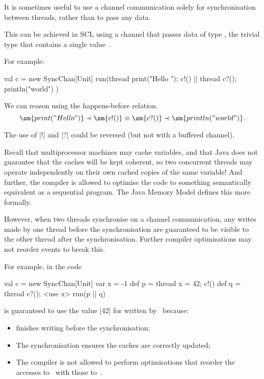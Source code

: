 
It is sometimes useful to use a channel communication solely for
synchronisation between threads, rather than to pass any data.

This can be achieved in SCL using a channel that passes data of type
, the trivial type that contains a single value~\SCALA{()}.  

For example:
\begin{scala}
val c = new SyncChan[Unit]
run(thread{ print("Hello "); c!() } || thread{ c?(); println("world") })
\end{scala}

We can reason using the happens-before relation.
\[
\sm{print("Hello")} \prec \sm{c!()} \equiv \sm{c?()} \prec \sm{println("world")}.
\]

The use of |!| and |?| could be reversed (but not with a buffered channel).



Recall that multiprocessor machines may cache variables, and that Java does
not guarantee that the caches will be kept coherent, so two concurrent
threads may operate independently on their own cached copies of the same
variable!  And further, the compiler is allowed to optimise the code to
something semantically equivalent as a sequential program.  The Java Memory
Model
defines this more formally.

However, when two threads synchronise on a channel communication, any writes
made by one thread before the synchronisation are guaranteed to be visible to
the other thread after the synchronisation.  
Further compiler optimisations may not reorder events to break this.



For example, in the code
\begin{scala}
val c = new SyncChan[Unit]
var x = -1
def p = thread{ x = 42; c!() }
def q = thread{ c?(); <use x> }
run(p || q)
\end{scala}
%
 is guaranteed to use the value |42| for  written
by~ because:
%
\begin{itemize}
\item 
{} finishes writing before the synchronisation;

\item
The synchronisation ensures the caches are correctly updated;

\item
The compiler is not allowed to perform optimisations that reorder the accesses
to~ with those to~.
\end{itemize}

